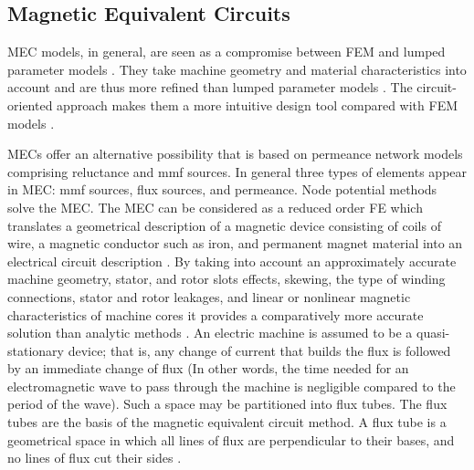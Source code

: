 \subsection{Magnetic Equivalent Circuits}

MEC models, in general, are seen as a compromise between FEM and lumped parameter models \parencite{sudhoff2007magnetic}. They take machine geometry and material characteristics into account and are thus more refined than lumped parameter models \parencite{amrhein2007magnetic, moallem1998improved}. The circuit-oriented approach makes them a more intuitive design tool compared with FEM models \parencite{tavana2016real,asghari2012experimental}. 

MECs offer an alternative possibility that is based on permeance network models comprising reluctance and mmf sources. In general three types of elements appear in MEC: mmf sources, flux sources, and permeance. Node potential methods \parencite{osto1987} solve the MEC. The MEC can be considered as a reduced order FE which translates a geometrical description of a magnetic device consisting of coils of wire, a magnetic conductor such as iron, and permanent magnet material into an electrical circuit description \parencite{krause2013analysis}. By taking into account an approximately accurate machine geometry, stator, and rotor slots effects, skewing, the type of winding connections, stator and rotor leakages, and linear or nonlinear magnetic characteristics of machine cores it provides a comparatively more accurate solution than analytic methods \parencite{carpenter1968magnetic}. An electric machine is assumed to be a quasi-stationary device; that is, any change of current that builds the flux is followed by an immediate change of flux (In other words, the time needed for an electromagnetic wave to pass through the machine is negligible compared to the period of the wave). Such a space may be partitioned into flux tubes. The flux tubes are the basis of the magnetic equivalent circuit method. A flux tube is a geometrical space in which all lines of flux are perpendicular to their bases, and no lines of flux cut their sides \parencite{ostovic2012dynamics}. 

